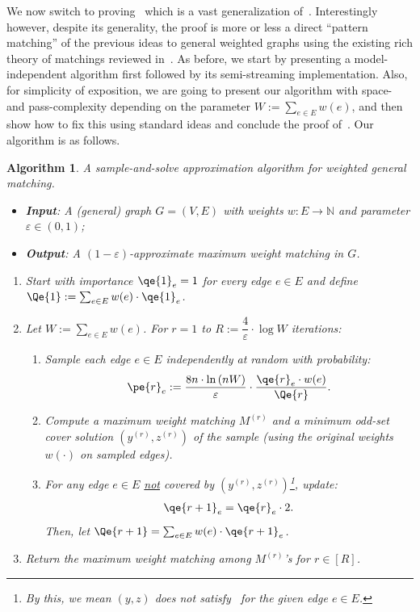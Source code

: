 \documentclass{article}
\newtheorem{Algorithm}[theorem]{Algorithm}
\newcommand{\eps}{\varepsilon}
\newcommand{\IN}{\mathbb{N}}
\begin{document}
We now switch to proving~ which is a vast generalization of~. Interestingly however, 
despite its generality, the proof is more or less a direct ``pattern matching'' of the previous ideas to general weighted graphs using 
the existing rich theory of matchings reviewed in~. As before, we start by presenting a model-independent algorithm first followed by its semi-streaming implementation. Also, for simplicity of exposition, we are going to present our algorithm 
with space- and pass-complexity depending on the parameter $W := \sum_{e \in E} w(e)$, and then show how to fix this using
standard ideas and conclude the proof of~. Our algorithm is as follows. 


\begin{Algorithm}\label{alg:general}
A sample-and-solve approximation algorithm for weighted general matching. 

\begin{itemize}
	\item \textbf{Input}: A (general) graph $G=(V,E)$ with weights $w: E \rightarrow \IN$ and parameter $\eps \in (0,1)$; 
	\item \textbf{Output}: A $(1-\eps)$-approximate maximum weight matching in $G$. 
\end{itemize}

	\begin{enumerate}
	\item Start with {importance} $\qe{1}_e = 1$ for every edge $e \in E$ and define $\Qe{1} := \sum_{e \in E} w(e) \cdot \qe{1}_e$. 
	\item Let $W:= \sum_{e \in E} w(e)$. For $r=1$ to $R := \dfrac{4}{\eps} \cdot \log{W}$ iterations: 
	\begin{enumerate}
	\item Sample each edge $e \in E$ independently at random with probability:
	\begin{align}
		\pe{r}_e := {\frac{8n \cdot \ln{(nW)}}{\eps} \cdot \frac{\qe{r}_e \cdot w(e)}{\Qe{r}}}. \label{eq:pe-general}
	\end{align}
	\item\label{line:2-general} Compute a maximum weight matching $M^{(r)}$ and a minimum odd-set cover solution $(y^{(r)},z^{(r)})$ of the sample (using the original weights $w(\cdot)$ on sampled edges). 
	\item\label{line:we-defined-this} For any edge $e \in E$ \underline{not} covered by $(y^{(r)},z^{(r)})$\footnote{By this, we mean $(y,z)$ does \emph{not} satisfy~ for the given edge $e \in E$.}, update: 
	\begin{align}
		\qe{r+1}_e = \qe{r}_e \cdot 2. \label{eq:qe-general}
	\end{align}
	Then, let $\Qe{r+1} = \sum_{e \in E} w(e) \cdot \qe{r+1}_e$. 
	\end{enumerate}
	\item Return the maximum weight matching among $M^{(r)}$'s for $r \in [R]$. 
	\end{enumerate}
\end{Algorithm}
\end{document}
